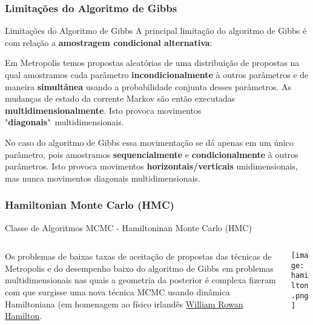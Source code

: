 \subsubsection{Limitações do Algoritmo de Gibbs}
\begin{frame}{Limitações do Algoritmo de Gibbs}
  A principal limitação do algoritmo de Gibbs é com relação a
  \textbf{amostragem condicional alternativa}:
  \begin{vfilleditems}
    \item Em Metropolis temos propostas aleatórias
    de uma distribuição de propostas na qual amostramos cada parâmetro
    \textbf{incondicionalmente} à outros parâmetros e de maneira \textbf{simultânea} usando a
    probabilidade conjunta desses parâmetros. As mudanças de estado da corrente
    Markov são então executadas \textbf{multidimensionalmente}.
    Isto provoca movimentos "\textbf{diagonais}"~multidimensionais.

    \item No caso do algoritmo de Gibbs essa movimentação se dá apenas em um
    único parâmetro, pois amostramos \textbf{sequencialmente} e
    \textbf{condicionalmente} à outros parâmetros.
    Isto provoca movimentos \textbf{horizontais/verticais} unidimensionais,
    mas nunca movimentos diagonais multidimensionais.
  \end{vfilleditems}
\end{frame}

\subsubsection{Hamiltonian Monte Carlo (HMC)}
\begin{frame}{Classe de Algoritmos MCMC - Hamiltoninan Monte Carlo (HMC)}
  \begin{columns}
    \begin{column}{0.8\textwidth}
      Os problemas de baixas taxas de aceitação de propostas das técnicas de
      Metropolis e do desempenho baixo do algoritmo de Gibbs em problemas
      multidimensionais nas quais a geometria da posterior é complexa
      fizeram com que surgisse uma nova técnica MCMC usando dinâmica Hamiltoniana
      (em homenagem ao físico irlandês
      \href{https://en.wikipedia.org/wiki/William_Rowan_Hamilton}{William Rowan Hamilton}.
    \end{column}
    \begin{column}{0.2\textwidth}
      \texttt{[image: hamilton.png]}
    \end{column}
  \end{columns}
\end{frame}

